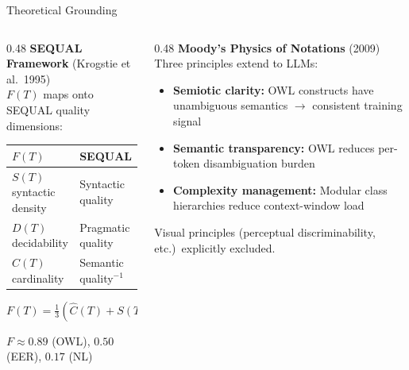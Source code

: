 \documentclass[aspectratio=169]{beamer}
\begin{document}
\begin{frame}{Theoretical Grounding}

\begin{columns}[T]
\begin{column}{0.48\textwidth}
\textbf{SEQUAL Framework} {\small(Krogstie et al.\ 1995)}\\[0.3em]
$F(T)$ maps onto SEQUAL quality dimensions:
\vspace{0.3em}

\begin{tabular}{@{}ll@{}}
\toprule
$F(T)$ & SEQUAL \\
\midrule
$S(T)$ syntactic density & Syntactic quality \\
$D(T)$ decidability & Pragmatic quality \\
$C(T)$ cardinality & Semantic quality$^{-1}$ \\
\bottomrule
\end{tabular}

\vspace{0.8em}
$F(T) = \tfrac{1}{3}(\hat{C}(T) + S(T) + D(T))$

\vspace{0.3em}
{\small $F \approx 0.89$ (OWL), $0.50$ (EER), $0.17$ (NL)}
\end{column}

\begin{column}{0.48\textwidth}
\textbf{Moody's Physics of Notations} {\small(2009)}\\[0.3em]
Three principles extend to LLMs:
\vspace{0.3em}
\begin{itemize}
    \item \textbf{Semiotic clarity:} OWL constructs have unambiguous semantics $\rightarrow$ consistent training signal
    \item \textbf{Semantic transparency:} OWL reduces per-token disambiguation burden
    \item \textbf{Complexity management:} Modular class hierarchies reduce context-window load
\end{itemize}

\vspace{0.5em}
{\small\color{gray} Visual principles (perceptual discriminability, etc.)\ explicitly excluded.}
\end{column}
\end{columns}

\end{frame}
\end{document}
